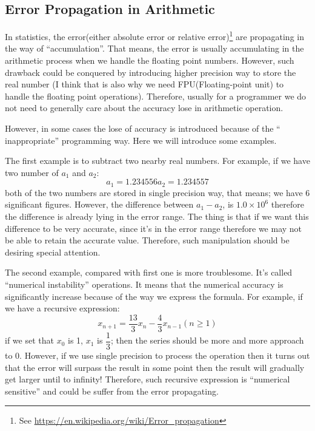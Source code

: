 \subsection{Error Propagation in Arithmetic}
%
%
\label{error_propagation_numerical}
In statistics, the error(either absolute error or relative error)\footnote{
See \url{https://en.wikipedia.org/wiki/Error_propagation}} are propagating in
the way of ``accumulation''. That means, the error is usually accumulating in
the arithmetic process when we handle the floating point numbers. However, such
drawback could be conquered by introducing higher precision way to store the 
real number (I think that is also why we need FPU(Floating-point unit) to 
handle the floating point operations). Therefore, usually for a programmer we 
do not need to generally care about the accuracy lose in arithmetic operation.

However, in some cases the lose of accuracy is introduced because of the ``
inappropriate'' programming way. Here we will introduce some examples.

The first example is to subtract two nearby real numbers. For example, if we 
have two number of $a_{1}$ and $a_{2}$:
\begin{equation}
 a_{1} = 1.234556   a_{2} = 1.234557
\end{equation}
both of the two numbers are stored in single precision way, that means; we have
6 significant figures. However, the difference between $a_{1}-a_{2}$, is 
$1.0\times 10^{6}$ therefore the difference is already lying in the error range.
The thing is that if we want this difference to be very accurate, since it's 
in the error range therefore we may not be able to retain the accurate value.
Therefore, such manipulation should be desiring special attention.

The second example, compared with first one is more troublesome. It's called
``numerical instability'' operations. It means that the numerical accuracy 
is significantly increase because of the way we express the formula. For example,
if we have a recursive expression:
\begin{equation}
 x_{n+1} = \frac{13}{3}x_{n} - \frac{4}{3}x_{n-1} (n\geq 1)
\end{equation}
if we set that $x_{0}$ is 1, $x_{1}$ is $\dfrac{1}{3}$; then the series 
should be more and more approach to 0. However, if we use single precision
to process the operation then it turns out that the error will surpass the 
result in some point then the result will gradually get larger until to infinity! 
Therefore, such recursive expression is ``numerical sensitive'' and could be 
suffer from the error propagating.

